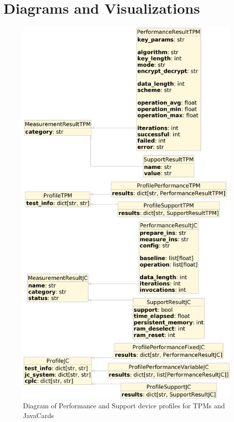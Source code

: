 \chapter{Diagrams and Visualizations}\label{appendix:diagrams-visualizations}
\begin{figure}[H]
    \centering
    \includegraphics[width=\textwidth,height=\textheight-5cm, keepaspectratio]{img/diagrams/object_diagram.png}
    \caption{Diagram of Performance and Support device profiles for TPMs and JavaCards}
    \label{fig:dev-profiles-diagram}
\end{figure}

